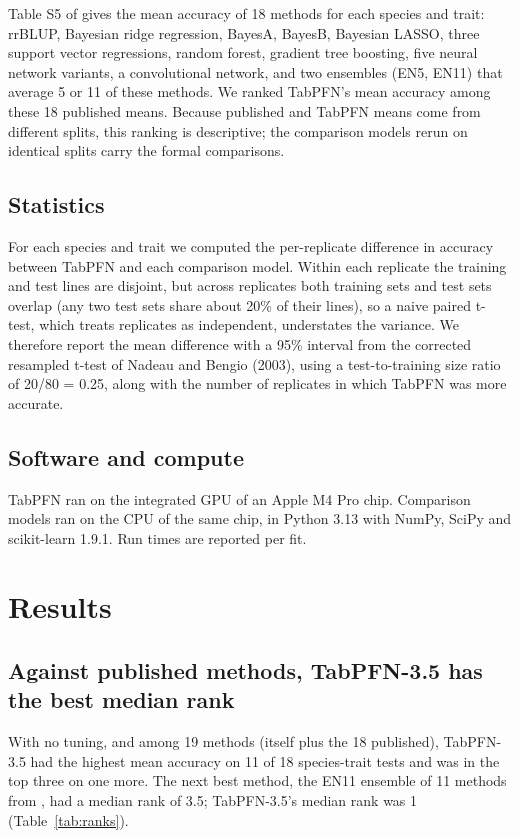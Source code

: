 \documentclass[11pt]{article}
\begin{document}
Table S5 of \citet{azodi2019} gives the mean accuracy of 18 methods for each species and trait: rrBLUP, Bayesian ridge regression, BayesA, BayesB, Bayesian LASSO, three support vector regressions, random forest, gradient tree boosting, five neural network variants, a convolutional network, and two ensembles (EN5, EN11) that average 5 or 11 of these methods. We ranked TabPFN's mean accuracy among these 18 published means. Because published and TabPFN means come from different splits, this ranking is descriptive; the comparison models rerun on identical splits carry the formal comparisons.

\subsection{Statistics}

For each species and trait we computed the per-replicate difference in accuracy between TabPFN and each comparison model. Within each replicate the training and test lines are disjoint, but across replicates both training sets and test sets overlap (any two test sets share about 20\% of their lines), so a naive paired t-test, which treats replicates as independent, understates the variance. We therefore report the mean difference with a 95\% interval from the corrected resampled t-test of Nadeau and Bengio (2003), using a test-to-training size ratio of 20/80 = 0.25, along with the number of replicates in which TabPFN was more accurate.

\subsection{Software and compute}

TabPFN ran on the integrated GPU of an Apple M4 Pro chip. Comparison models ran on the CPU of the same chip, in Python 3.13 with NumPy, SciPy and scikit-learn 1.9.1. Run times are reported per fit.

\section{Results}

\subsection{Against published methods, TabPFN-3.5 has the best median rank}

With no tuning, and among 19 methods (itself plus the 18 published), TabPFN-3.5 had the highest mean accuracy on 11 of 18 species-trait tests and was in the top three on one more. The next best method, the EN11 ensemble of 11 methods from \citet{azodi2019}, had a median rank of 3.5; TabPFN-3.5's median rank was 1 (Table~\ref{tab:ranks}).
\end{document}
